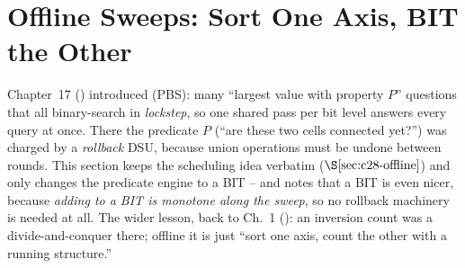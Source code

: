\section{Offline Sweeps: Sort One Axis, BIT the Other}\label{sec:c14-offline}

\begin{previouslybox}
Chapter~17 () introduced  (PBS): many
``largest value with property \(P\)'' questions that all binary-search in
\emph{lockstep}, so one shared pass per bit level answers every query at once.
There the predicate \(P\) (``are these two cells connected yet?'') was charged
by a \emph{rollback} DSU, because union operations must be undone between
rounds.  This section keeps the scheduling idea verbatim (\(\secref{c28-offline}\))
and only changes the predicate engine to a BIT -- and notes that a BIT is even
nicer, because \emph{adding to a BIT is monotone along the sweep}, so no
rollback machinery is needed at all.  The wider lesson, back to Ch.~1
(): an inversion count was a divide-and-conquer there; offline it is
just ``sort one axis, count the other with a running structure.''
\end{previouslybox}


